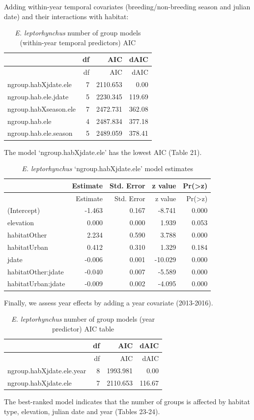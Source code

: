 \documentclass[]{article}
\begin{document}
Adding within-year temporal covariates (breeding/non-breeding season and
julian date) and their interactions with habitat:

\begin{longtable}[]{@{}lrrr@{}}
\caption{\textit{E. leptorhynchus} number of group models (within-year
temporal predictors) AIC}\tabularnewline
\toprule
& df & AIC & dAIC\tabularnewline
\midrule
\endfirsthead
\toprule
& df & AIC & dAIC\tabularnewline
\midrule
\endhead
ngroup.habXjdate.ele & 7 & 2110.653 & 0.00\tabularnewline
ngroup.hab.ele.jdate & 5 & 2230.345 & 119.69\tabularnewline
ngroup.habXseason.ele & 7 & 2472.731 & 362.08\tabularnewline
ngroup.hab.ele & 4 & 2487.834 & 377.18\tabularnewline
ngroup.hab.ele.season & 5 & 2489.059 & 378.41\tabularnewline
\bottomrule
\end{longtable}

The model `ngroup.habXjdate.ele' has the lowest AIC (Table 21).

\begin{longtable}[]{@{}lrrrr@{}}
\caption{\textit{E. leptorhynchus} `ngroup.habXjdate.ele' model
estimates}\tabularnewline
\toprule
& Estimate & Std. Error & z value &
Pr(\textgreater{}\textbar{}z\textbar{})\tabularnewline
\midrule
\endfirsthead
\toprule
& Estimate & Std. Error & z value &
Pr(\textgreater{}\textbar{}z\textbar{})\tabularnewline
\midrule
\endhead
(Intercept) & -1.463 & 0.167 & -8.741 & 0.000\tabularnewline
elevation & 0.000 & 0.000 & 1.939 & 0.053\tabularnewline
habitatOther & 2.234 & 0.590 & 3.788 & 0.000\tabularnewline
habitatUrban & 0.412 & 0.310 & 1.329 & 0.184\tabularnewline
jdate & -0.006 & 0.001 & -10.029 & 0.000\tabularnewline
habitatOther:jdate & -0.040 & 0.007 & -5.589 & 0.000\tabularnewline
habitatUrban:jdate & -0.009 & 0.002 & -4.095 & 0.000\tabularnewline
\bottomrule
\end{longtable}

Finally, we assess year effects by adding a year covariate (2013-2016).

\begin{longtable}[]{@{}lrrr@{}}
\caption{\textit{E. leptorhynchus} number of group models (year
predictor) AIC table}\tabularnewline
\toprule
& df & AIC & dAIC\tabularnewline
\midrule
\endfirsthead
\toprule
& df & AIC & dAIC\tabularnewline
\midrule
\endhead
ngroup.habXjdate.ele.year & 8 & 1993.981 & 0.00\tabularnewline
ngroup.habXjdate.ele & 7 & 2110.653 & 116.67\tabularnewline
\bottomrule
\end{longtable}

The best-ranked model indicates that the number of groups is affected by
habitat type, elevation, julian date and year (Tables 23-24).
\end{document}
